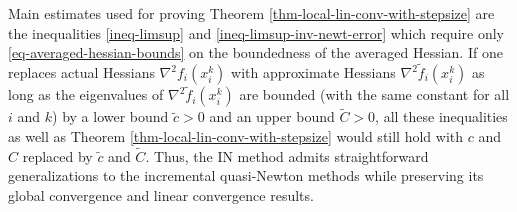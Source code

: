 \documentclass[final,numbook]{svjour3}
\begin{document}
\begin{remark}\label{rema-quasi-newton-extension} Main estimates used for proving Theorem \ref{thm-local-lin-conv-with-stepsize} are the inequalities \eqref{ineq-limsup} and \eqref{ineq-limsup-inv-newt-error} which require only \eqref{eq-averaged-hessian-bounds} on the boundedness of the averaged Hessian. If one replaces actual Hessians $\nabla^2 f_i(x_i^k)$ with approximate Hessians $\nabla^2 \tilde{f}_i(x_i^k)$ as long as the eigenvalues of $\nabla^2 \tilde{f}_i(x_i^k)$ are bounded (with the same constant for all $i$ and $k$) by a lower bound $\tilde{c}>0$ and an upper bound $\tilde{C}>0$, all these inequalities as well as Theorem \ref{thm-local-lin-conv-with-stepsize} would still hold with $c$ and $C$ replaced by $\tilde{c }$ and $\tilde{C}$. Thus, the IN method admits straightforward generalizations to the incremental quasi-Newton methods while preserving its global convergence and linear convergence results. 
\end{remark}
\end{document}
